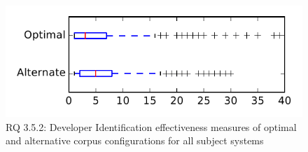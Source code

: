 
\begin{figure}
\centering
\includegraphics[height=0.4\textheight]{figures/combo/dit_rq2_tiny}
\caption{RQ 3.5.2: Developer Identification effectiveness measures of optimal and alternative corpus configurations for all subject systems}
\label{fig:combo:dit:rq2:tiny}
\end{figure}
